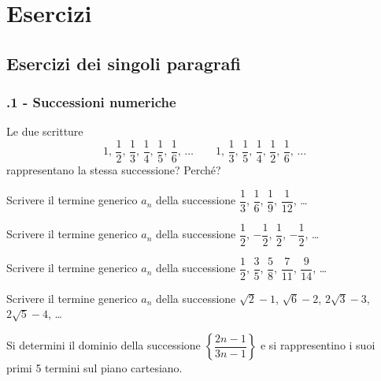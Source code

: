 \section{Esercizi}
\subsection{Esercizi dei singoli paragrafi}
\subsubsection*{\thechapter.1 - Successioni numeriche}

\begin{esercizio}
\label{ese:8a_succ.1}
Le due scritture
\[1\text{, }\frac{1}{2}\text{, }\frac{1}{3}\text{, }\frac{1}{4}\text{, }\frac{1}{5}\text{, }\frac{1}{6}\text{, }\ldots \qquad
1\text{, }\frac{1}{3}\text{, }\frac{1}{5}\text{, }\frac{1}{4}\text{, }\frac{1}{2}\text{, }\frac{1}{6}\text{, }\ldots\]
rappresentano la stessa successione? Perché?
\end{esercizio}

\begin{esercizio}
\label{ese:8a_succ.2}
Scrivere il termine generico $a_n$ della successione $\dfrac{1}{3}$, $\dfrac{1}{6}$, $\dfrac{1}{9}$, $\dfrac{1}{12}$, \ldots{}
\end{esercizio}

\begin{esercizio}
\label{ese:8a_succ.3}
Scrivere il termine generico $a_n$ della successione $\dfrac{1}{2}$, $-\dfrac{1}{2}$, $\dfrac{1}{2}$, $-\dfrac{1}{2}$, \ldots{}
\end{esercizio}

\begin{esercizio}
\label{ese:8a_succ.4}
Scrivere il termine generico $a_n$ della successione $\dfrac{1}{2}$, $\dfrac{3}{5}$, $\dfrac{5}{8}$, $\dfrac{7}{11}$, $\dfrac{9}{14}$, \ldots{}
\end{esercizio}

\begin{esercizio}
\label{ese:8a_succ.5}
Scrivere il termine generico $a_n$ della successione $\sqrt{2}-1$, $\sqrt{6}-2$, $2\sqrt{3}-3$, $2\sqrt{5}-4$, \ldots{}
\end{esercizio}

\begin{esercizio}
\label{ese:8a_succ.6}
Si determini il dominio della successione $\left\{\dfrac{2n-1}{3n-1}\right\}$ e si rappresentino i suoi primi 5 termini sul piano cartesiano.
\end{esercizio}

